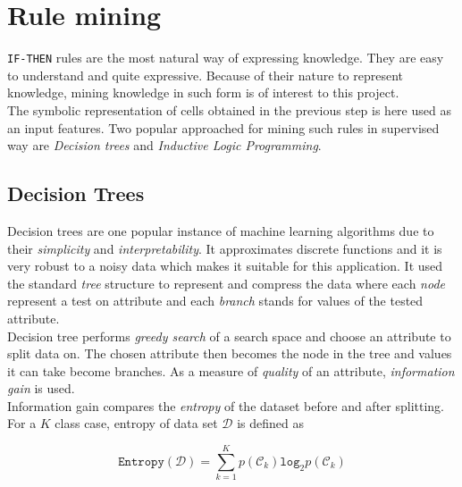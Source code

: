 
\chapter{Rule mining} %

\label{Chapter7} %


\texttt{IF-THEN} rules are the most natural way of expressing knowledge. They are easy to understand and quite expressive. Because of their nature to represent knowledge, mining knowledge in such form is of interest to this project. \\

The symbolic representation of cells obtained in the previous step is here used as an input features. Two popular approached for mining such rules in supervised way are \textit{Decision trees} and \textit{Inductive Logic Programming}.




\section{Decision Trees}

Decision trees are one popular instance of machine learning algorithms due to their \textit{simplicity} and \textit{interpretability}. It approximates discrete functions and it is very robust to a noisy data which makes it suitable for this application. It used the standard \textit{tree} structure to represent and compress the data where each \textit{node} represent a test on attribute and each \textit{branch} stands for values of the tested attribute. \\

Decision tree performs \textit{greedy search} of a search space and choose an attribute to split data on. The chosen attribute then becomes the node in the tree and values it can take become branches. As a measure of \textit{quality} of an attribute, \textit{information gain} is used. \\

Information gain compares the \textit{entropy} of the dataset before and after splitting. For a $K$ class case, entropy of data set $\mathcal{D}$ is defined as

\begin{equation}
	\mathtt{Entropy}(\mathcal{D}) = \sum_{k=1}^K p(\mathcal{C}_k)\mathtt{log}_2 p(\mathcal{C}_k)
\end{equation}

